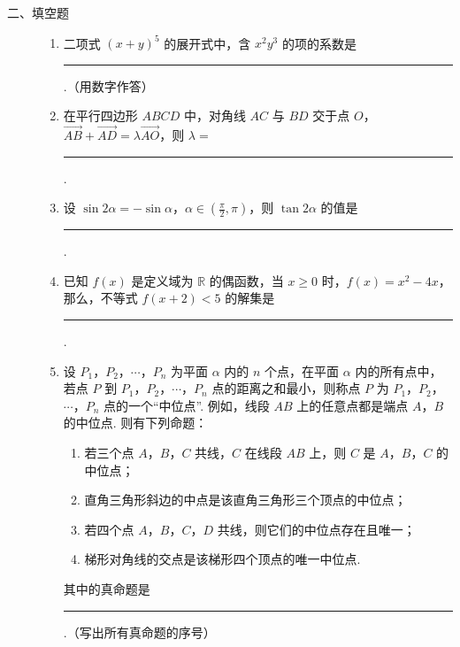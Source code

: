 \begin{description}

    \item[二、填空题]

    \begin{enumerate}[leftmargin=5pt]

      \addtocounter{enumi}{+10}

        \item 二项式 \((x + y)^5\) 的展开式中，含 \(x^2 y^3\) 的项的系数是\rule[-0.3ex]{3em}{0.4pt}.（用数字作答）

        \item 在平行四边形 \(ABCD\) 中，对角线 \(AC\) 与 \(BD\) 交于点 \(O\)，\(\overrightarrow{AB} + \overrightarrow{AD} = \lambda \overrightarrow{AO}\)，则 \(\lambda =\)\rule[-0.3ex]{3em}{0.4pt}.

        \item 设 \(\sin 2\alpha = -\sin \alpha\)，\(\alpha \in \left(\frac{\pi}{2}, \pi\right)\)，则 \(\tan 2\alpha\) 的值是\rule[-0.3ex]{3em}{0.4pt}.

        \item 已知 \( f(x) \) 是定义域为 \( \mathbb{R} \) 的偶函数，当 \( x \geqslant 0 \) 时，\( f(x) = x^2 - 4x \)，那么，不等式 \( f(x + 2) < 5 \) 的解集是\rule[-0.3ex]{3em}{0.4pt}.

        \item 设 \(P_1\)，\(P_2\)，\(\cdots\)，\(P_n\) 为平面 \(\alpha\) 内的 \(n\) 个点，在平面 \(\alpha\) 内的所有点中，若点 \(P\) 到 \(P_1\)，\(P_2\)，\(\cdots\)，\(P_n\) 点的距离之和最小，则称点 \(P\) 为 \(P_1\)，\(P_2\)，\(\cdots\)，\(P_n\) 点的一个“中位点”. 例如，线段 \(AB\) 上的任意点都是端点 \(A\)，\(B\) 的中位点. 则有下列命题：

\begin{enumerate}
\item 若三个点 \(A\)，\(B\)，\(C\) 共线，\(C\) 在线段 \(AB\) 上，则 \(C\) 是 \(A\)，\(B\)，\(C\) 的中位点；
\item 直角三角形斜边的中点是该直角三角形三个顶点的中位点；
\item 若四个点 \(A\)，\(B\)，\(C\)，\(D\) 共线，则它们的中位点存在且唯一；
\item 梯形对角线的交点是该梯形四个顶点的唯一中位点.
\end{enumerate}

其中的真命题是\rule[-0.3ex]{3em}{0.4pt}.（写出所有真命题的序号）

    \end{enumerate}

\end{description}

